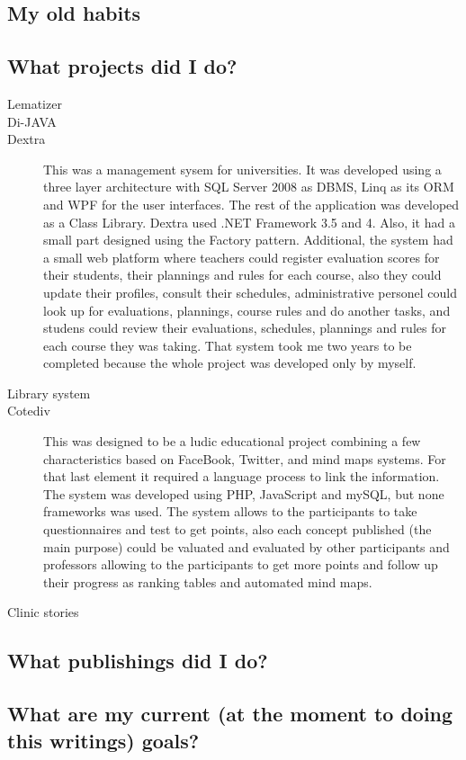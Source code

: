 \subsection{My old habits}

\subsection{What projects did I do?}
\begin{multicols}{2}
\begin{description}
\item[Lematizer]
\item[Di-JAVA]
\item[Dextra] This was a management sysem for universities. It was developed using a three layer architecture with SQL Server 2008 as DBMS, Linq as  its ORM and WPF for the user interfaces. The rest of the application was developed as a Class Library. Dextra used .NET Framework 3.5 and 4. Also, it had a small part designed using the Factory pattern. Additional, the system had a small web platform where teachers could register evaluation scores for their students, their plannings and rules for each course, also they could update their profiles, consult their schedules, administrative personel could look up for evaluations, plannings, course rules and do another tasks, and studens could review their evaluations, schedules, plannings and rules for each course they was taking. That system took me two years to be completed because the whole project was developed only by myself.
\item[Library system]
\item[Cotediv] This was designed to be a ludic educational project combining a few characteristics based on FaceBook, Twitter, and mind maps systems. For that last element it required a language process to link the information. The system was developed using PHP, JavaScript and mySQL, but none frameworks was used. The system allows to the participants to take questionnaires and test to get points, also each concept published (the main purpose) could be valuated and evaluated by other participants and professors allowing to the participants to get more points and follow up their progress as ranking tables and automated mind maps.
\item[Clinic stories]
\end{description}
\end{multicols}
\subsection{What publishings did I do?}

\subsection{What are my current (at the moment to doing this writings) goals?}

